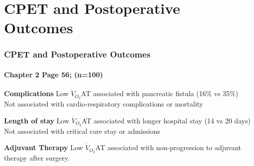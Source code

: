 \documentclass[10pt]{beamer}
\begin{document}
\section[Chapter 2]{CPET and Postoperative Outcomes}
\begin{frame}
	\frametitle{CPET and Postoperative Outcomes}
	\framesubtitle{Chapter 2 Page 56; (n=100)}
	\begin{block}{\textbf{Complications}}
		Low $\dot{V}_{O_2}$AT associated with pancreatic fistula (16\% vs 35\%) \\
		Not associated with cardio-respiratory complications or mortality
	\end{block}
	
	\begin{block}{\textbf{Length of stay}}
		Low $\dot{V}_{O_2}$AT associated with longer hospital stay (14 vs 20 days)\\
		Not associated with critical care stay or admissions
	\end{block}
	
	\begin{block}{\textbf{Adjuvant Therapy}}
		Low $\dot{V}_{O_2}$AT associated with non-progression to adjuvant therapy after surgery.
	\end{block}
\end{frame}
\end{document}
